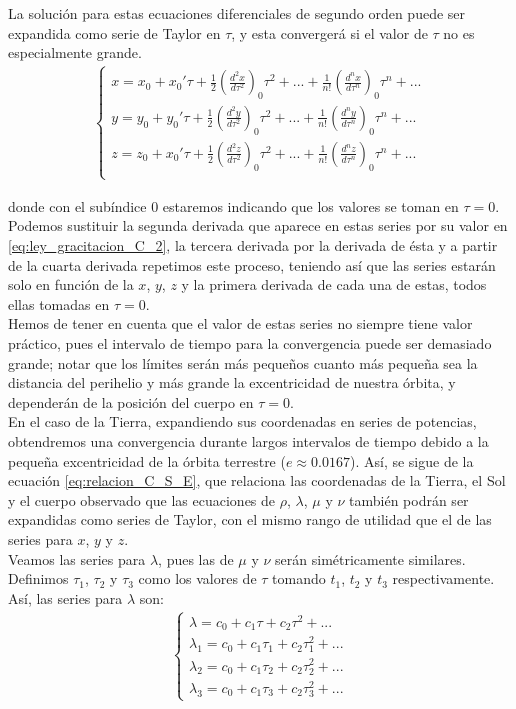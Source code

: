 \documentclass[11pt]{article}
\begin{document}
La solución para estas ecuaciones diferenciales de segundo orden puede ser expandida como serie de Taylor en $\tau$, y esta convergerá si el valor de $\tau$ no es especialmente grande.
\begin{align}
\left\{
\begin{array}{l}
	x=x_0+x_0'\tau+\frac{1}{2}(\frac{d^2x}{d\tau^2})_0\tau^2+...+\frac{1}{n!}(\frac{d^nx}{d\tau^n})_0\tau^n+...\\
	y=y_0+y_0'\tau+\frac{1}{2}(\frac{d^2y}{d\tau^2})_0\tau^2+...+\frac{1}{n!}(\frac{d^ny}{d\tau^n})_0\tau^n+...\\
	z=z_0+x_0'\tau+\frac{1}{2}(\frac{d^2z}{d\tau^2})_0\tau^2+...+\frac{1}{n!}(\frac{d^nz}{d\tau^n})_0\tau^n+...\\	
\end{array}
\right.
\label{eq:series_taylor}
\end{align}

\noindent donde con el subíndice 0 estaremos indicando que los valores se toman en $\tau=0$. Podemos sustituir la segunda derivada que aparece en estas series por su valor en \ref{eq:ley_gracitacion_C_2}, la tercera derivada por la derivada de ésta y a partir de la cuarta derivada repetimos este proceso, teniendo así que las series estarán solo en función de la $x$, $y$, $z$ y la primera derivada de cada una de estas, todos ellas tomadas en $\tau=0$.\\

Hemos de tener en cuenta que el valor de estas series no siempre tiene valor práctico, pues el intervalo de tiempo para la convergencia puede ser demasiado grande; notar que los límites serán más pequeños cuanto más pequeña sea la distancia del perihelio y más grande la excentricidad de nuestra órbita, y dependerán de la posición del cuerpo en $\tau=0$.\\

En el caso de la Tierra, expandiendo sus coordenadas en series de potencias, obtendremos una convergencia durante largos intervalos de tiempo debido a la pequeña excentricidad de la órbita terrestre ($e\approx0.0167$). Así, se sigue de la ecuación \ref{eq:relacion_C_S_E}, que relaciona las coordenadas de la Tierra, el Sol y el cuerpo observado que las ecuaciones de $\rho$, $\lambda$, $\mu$ y $\nu$ también podrán ser expandidas como series de Taylor, con el mismo rango de utilidad que el de las series para $x$, $y$ y $z$.\\

Veamos las series para $\lambda$, pues las de $\mu$ y $\nu$ serán simétricamente similares. Definimos $\tau_1$, $\tau_2$ y $\tau_3$ como los valores de $\tau$ tomando $t_1$, $t_2$ y $t_3$ respectivamente. Así, las series para $\lambda$ son:
\begin{align}
\left\{
\begin{array}{l}
\lambda=c_0+c_1\tau+c_2\tau^2+...\\
\lambda_1=c_0+c_1\tau_1+c_2\tau_1^2+...\\
\lambda_2=c_0+c_1\tau_2+c_2\tau_2^2+...\\
\lambda_3=c_0+c_1\tau_3+c_2\tau_3^2+...
\end{array}
\right.
\label{eq:series_lambda}
\end{align}
\end{document}
